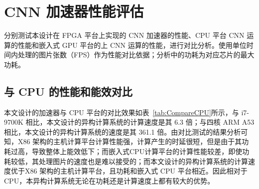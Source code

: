 
\section{CNN 加速器性能评估}

分别测试本设计在 FPGA 平台上实现的 CNN 加速器的性能、CPU 平台 CNN 运算的性能和嵌入式 GPU 平台的上 CNN 运算的性能，进行对比分析。使用单位时间内处理的图片张数（FPS）作为性能对比依据；分析中的功耗为对应芯片的最大功耗。

\subsection{与 CPU 的性能和能效对比}


本文设计的加速器与 CPU 平台的对比效果如表~\ref{tab:CompareCPU}所示，与 i7-9700K 相比，本文设计的异构计算系统的计算速度是其 6.3 倍；与四核 ARM A53 相比，本文设计的异构计算系统的速度是其 361.1 倍。由对比测试的结果分析可知，X86 架构的主机计算平台计算性能强，计算产生的时延很短，但是由于其功耗过高，导致整体上能效低下；而嵌入式CPU计算平台的计算性能较差，即使功耗较低，其处理图片的速度也是难以接受的；而本文设计的异构计算系统的计算速度优于X86 架构的主机计算平台，且功耗和嵌入式 CPU 平台相近。因此相对于 CPU，本异构计算系统无论在功耗还是计算速度上都有较大的优势。

